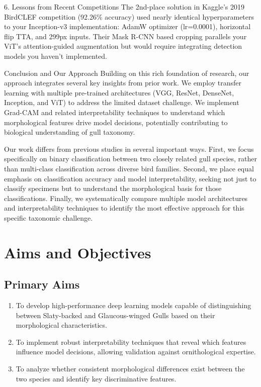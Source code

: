 \documentclass[a4paper,12pt]{article}
\begin{document}
6. Lessons from Recent Competitions
The 2nd-place solution in Kaggle's 2019 BirdCLEF competition (92.26\% accuracy) used nearly identical hyperparameters to your Inception-v3 implementation: AdamW optimizer (lr=0.0001), horizontal flip TTA, and 299px inputs. Their Mask R-CNN based cropping parallels your ViT's attention-guided augmentation but would require integrating detection models you haven't implemented.

Conclusion and Our Approach
Building on this rich foundation of research, our approach integrates several key insights from prior work. We employ transfer learning with multiple pre-trained architectures (VGG, ResNet, DenseNet, Inception, and ViT) to address the limited dataset challenge. We implement Grad-CAM and related interpretability techniques to understand which morphological features drive model decisions, potentially contributing to biological understanding of gull taxonomy.

Our work differs from previous studies in several important ways. First, we focus specifically on binary classification between two closely related gull species, rather than multi-class classification across diverse bird families. Second, we place equal emphasis on classification accuracy and model interpretability, seeking not just to classify specimens but to understand the morphological basis for those classifications. Finally, we systematically compare multiple model architectures and interpretability techniques to identify the most effective approach for this specific taxonomic challenge.

\section*{Aims and Objectives}

\subsection*{Primary Aims}
\begin{enumerate}
    \item To develop high-performance deep learning models capable of distinguishing between Slaty-backed and Glaucous-winged Gulls based on their morphological characteristics.
    \item To implement robust interpretability techniques that reveal which features influence model decisions, allowing validation against ornithological expertise.
    \item To analyze whether consistent morphological differences exist between the two species and identify key discriminative features.
\end{enumerate}
\end{document}
